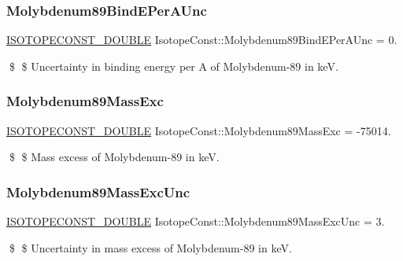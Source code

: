 \subsubsection{\texorpdfstring{Molybdenum89\+Bind\+E\+Per\+A\+Unc}{Molybdenum89BindEPerAUnc}}
{\footnotesize\ttfamily \mbox{\hyperlink{group___isotope_const-_macros_ga8f45a7272ce02c0b4c65c44636ed719a}{I\+S\+O\+T\+O\+P\+E\+C\+O\+N\+S\+T\+\_\+\+D\+O\+U\+B\+LE}} Isotope\+Const\+::\+Molybdenum89\+Bind\+E\+Per\+A\+Unc = 0.}

\$ \$ Uncertainty in binding energy per A of Molybdenum-\/89 in keV. \mbox{\label{group___isotope_const-_molybdenum-_mo89_gaadfb7c91360f524e59242fb010afc8fd}} 
\subsubsection{\texorpdfstring{Molybdenum89\+Mass\+Exc}{Molybdenum89MassExc}}
{\footnotesize\ttfamily \mbox{\hyperlink{group___isotope_const-_macros_ga8f45a7272ce02c0b4c65c44636ed719a}{I\+S\+O\+T\+O\+P\+E\+C\+O\+N\+S\+T\+\_\+\+D\+O\+U\+B\+LE}} Isotope\+Const\+::\+Molybdenum89\+Mass\+Exc = -\/75014.}

\$ \$ Mass excess of Molybdenum-\/89 in keV. \mbox{\label{group___isotope_const-_molybdenum-_mo89_ga641ba3d76104b229cbf427259002d4a4}} 
\subsubsection{\texorpdfstring{Molybdenum89\+Mass\+Exc\+Unc}{Molybdenum89MassExcUnc}}
{\footnotesize\ttfamily \mbox{\hyperlink{group___isotope_const-_macros_ga8f45a7272ce02c0b4c65c44636ed719a}{I\+S\+O\+T\+O\+P\+E\+C\+O\+N\+S\+T\+\_\+\+D\+O\+U\+B\+LE}} Isotope\+Const\+::\+Molybdenum89\+Mass\+Exc\+Unc = 3.}

\$ \$ Uncertainty in mass excess of Molybdenum-\/89 in keV. \mbox{\label{group___isotope_const-_molybdenum-_mo89_gaa65a72a802de5a2dac32dbe38bbc1093}} 
